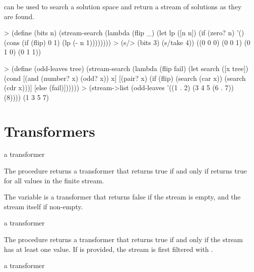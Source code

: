  can be used to search a solution space and return a stream of
solutions as they are found.

\codebegin
> (define (bits n)
    (stream-search
     (lambda (flip _)
       (let lp ([n n])
         (if (zero? n)
             '()
             (cons (if (flip) 0 1) (lp (- n 1))))))))
> (s/> (bits 3) (s/take 4))
((0 0 0) (0 0 1) (0 1 0) (0 1 1))
\codeend

\codebegin
> (define (odd-leaves tree)
    (stream-search
     (lambda (flip fail)
       (let search ([x tree])
         (cond
          [(and (number? x) (odd? x)) x]
          [(pair? x)
           (if (flip)
               (search (car x))
               (search (cdr x)))]
          [else (fail)])))))
> (stream->list (odd-leaves '((1 . 2) (3 4 5 (6 . 7)) (8))))
(1 3 5 7)
\codeend

\section {Transformers}

\begin{procedure}
\end{procedure}
\returns{} a transformer

The  procedure returns a transformer that returns true if and only if
 returns true for all values in the finite stream.

\begin{variable}
\end{variable}
\antipar

The  variable is a transformer that returns false if the stream is empty, and
the stream itself if non-empty.

\begin{procedure}
\end{procedure}
\returns{} a transformer

The  procedure returns a transformer that returns true if and only if the
stream has at least one value. If  is provided, the stream is first
filtered with .

\begin{procedure}
\end{procedure}
\returns{} a transformer

